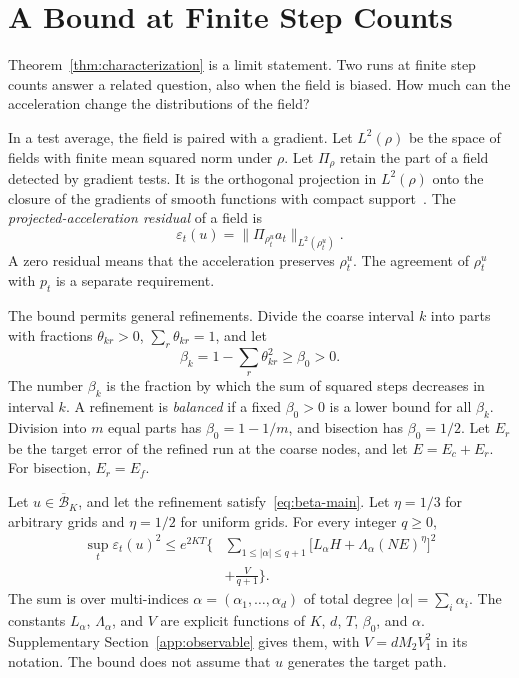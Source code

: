 \section{A Bound at Finite Step Counts}
\label{sec:observable}
Theorem~\ref{thm:characterization} is a limit statement. Two runs at
finite step counts answer a related question, also when the field is
biased. How much can the acceleration change the distributions of the
field?\AIassistance

In a test average, the field is paired with a gradient. Let $L^2(\rho)$
be the space of fields with finite mean squared norm under $\rho$. Let
$\Pi_\rho$ retain the part of a field detected by gradient tests. It is
the orthogonal projection in $L^2(\rho)$ onto the closure of the gradients
of smooth functions with compact
support~\citep{ambrosio2005gradient}. The
\emph{projected-acceleration residual} of a field is
\[
 \varepsilon_t(u)=\|\Pi_{\rho_t^u}a_t\|_{L^2(\rho_t^u)}.
\]
A zero residual means that the acceleration preserves $\rho_t^u$. The
agreement of $\rho_t^u$ with $p_t$ is a separate requirement.

The bound permits general refinements. Divide the coarse interval $k$
into parts with fractions $\theta_{kr}>0$, $\sum_r\theta_{kr}=1$, and
let
\begin{equation}\label{eq:beta-main}
 \beta_k=1-\sum_r\theta_{kr}^2\ge\beta_0>0.
\end{equation}
The number $\beta_k$ is the fraction by which the sum of squared steps
decreases in interval $k$. A refinement is \emph{balanced} if a fixed
$\beta_0>0$ is a lower bound for all $\beta_k$. Division into $m$ equal
parts has $\beta_0=1-1/m$, and bisection has $\beta_0=1/2$. Let $E_r$ be
the target error of the refined run at the coarse nodes, and let
$E=E_c+E_r$. For bisection, $E_r=E_f$.

\begin{theorem}\label{thm:quantitative-main}
Let $u\in\overline{\mathcal B}_K$, and let the refinement
satisfy~\eqref{eq:beta-main}. Let $\eta=1/3$ for arbitrary grids and
$\eta=1/2$ for uniform grids. For every integer $q\ge0$,
\begin{equation}\label{eq:quantitative-main}
\begin{split}
 \sup_t\varepsilon_t(u)^2\le e^{2KT}\Bigg\{&\sum_{1\le|\alpha|\le q+1}
 \big[L_\alpha H+\Lambda_\alpha(NE)^{\eta}\big]^2\\
 &+\frac{V}{q+1}\Bigg\}.
\end{split}
\end{equation}
The sum is over multi-indices $\alpha=(\alpha_1,\dots,\alpha_d)$ of
total degree $|\alpha|=\sum_i\alpha_i$. The constants $L_\alpha$, $\Lambda_\alpha$, and $V$ are explicit
functions of $K$, $d$, $T$, $\beta_0$, and $\alpha$. Supplementary
Section~\ref{app:observable} gives them, with $V=dM_2V_1^2$ in its
notation. The bound
does not assume that $u$ generates the target path.
\end{theorem}

